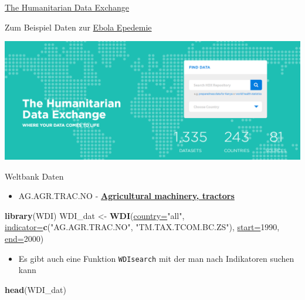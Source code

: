 \documentclass[ignorenonframetext,]{beamer}
\newenvironment{Shaded}{\begin{snugshade}}{\end{snugshade}}
\newcommand{\DataTypeTok}[1]{\textcolor[rgb]{0.74,0.68,0.62}{\underline{#1}}}
\newcommand{\DecValTok}[1]{\textcolor[rgb]{0.27,0.67,0.26}{#1}}
\newcommand{\KeywordTok}[1]{\textcolor[rgb]{0.26,0.66,0.93}{\textbf{#1}}}
\newcommand{\NormalTok}[1]{\textcolor[rgb]{0.74,0.68,0.62}{#1}}
\newcommand{\StringTok}[1]{\textcolor[rgb]{0.02,0.61,0.04}{#1}}
\providecommand{\tightlist}{%
  \setlength{\itemsep}{0pt}\setlength{\parskip}{0pt}}
\begin{document}
\begin{frame}{\href{data.hdx.rwlabs.org}{The Humanitarian Data
Exchange}}
\protect\hypertarget{the-humanitarian-data-exchange}{}

\begin{block}{Zum Beispiel Daten zur
\href{https://data.hdx.rwlabs.org/dataset/rowca-ebola-cases}{Ebola
Epedemie}}

\includegraphics{figure/HDx.PNG}

\end{block}

\end{frame}

\begin{frame}[fragile]{Weltbank Daten}
\protect\hypertarget{weltbank-daten}{}

\begin{itemize}
\tightlist
\item
  AG.AGR.TRAC.NO -
  \href{https://data.worldbank.org/indicator/AG.AGR.TRAC.NO}{\textbf{Agricultural
  machinery, tractors}}
\end{itemize}

\begin{Shaded}
\begin{Highlighting}[]
\KeywordTok{library}\NormalTok{(WDI) }
\NormalTok{WDI_dat <-}\StringTok{ }\KeywordTok{WDI}\NormalTok{(}\DataTypeTok{country=}\StringTok{"all"}\NormalTok{,}
    \DataTypeTok{indicator=}\KeywordTok{c}\NormalTok{(}\StringTok{"AG.AGR.TRAC.NO"}\NormalTok{,}
    \StringTok{"TM.TAX.TCOM.BC.ZS"}\NormalTok{),}
    \DataTypeTok{start=}\DecValTok{1990}\NormalTok{, }\DataTypeTok{end=}\DecValTok{2000}\NormalTok{)}
\end{Highlighting}
\end{Shaded}

\begin{itemize}
\tightlist
\item
  Es gibt auch eine Funktion \texttt{WDIsearch} mit der man nach
  Indikatoren suchen kann
\end{itemize}

\begin{Shaded}
\begin{Highlighting}[]
\KeywordTok{head}\NormalTok{(WDI_dat)}
\end{Highlighting}
\end{Shaded}

\end{frame}
\end{document}
